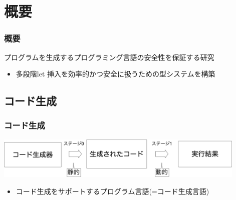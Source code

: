 
\section{概要}

\begin{frame}
  \frametitle{概要}
  プログラムを生成するプログラミング言語の安全性を保証する研究
  \begin{itemize}
  \item<1-> [⇒] \alert{多段階let 挿入}を効率的かつ安全に扱うための型システムを構築
  \end{itemize}
\end{frame}

\subsection{コード生成}
\begin{frame}
  \frametitle{コード生成}
  \medskip
  \flushleft
  \includegraphics[clip,height=2cm]{./img/prggen.png}

  \begin{itemize}
  \item コード生成をサポートするプログラム言語(=\alert{コード生成言語})
  \end{itemize}
\end{frame}

